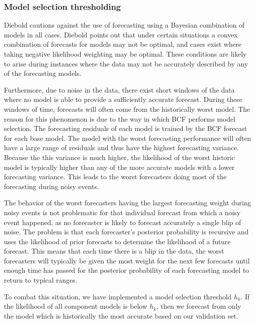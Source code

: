 \subsubsection{Model selection thresholding}
Diebold \cite{Diebold1991} cautions against the use of forecasting using a Bayesian combination of models in all cases.  Diebold points out that under certain situations a convex combination of forecasts for models may not be optimal, and cases exist where taking negative likelihood weighting may be optimal.  These conditions are likely to arise during instances where the data may not be accurately described by any of the forecasting models.  

Furthermore, due to noise in the data, there exist short windows of the data where no model is able to provide a sufficiently accurate forecast.  During these windows of time, forecasts will often come from the historically worst model.  The reason for this phenomenon is due to the way in which BCF performs model selection.  The forecasting residuals of each model is trained by the BCF forecast for each base model.  The model with the worst forecasting performance will often have a large range of residuals and thus have the highest forecasting variance.  Because the this variance is much higher, the likelihood of the worst historic model is typically higher than any of the more accurate models with a  lower forecasting variance.  This leads to the worst forecasters doing most of the forecasting during noisy events.  

The behavior of the worst forecasters having the largest forecasting weight during noisy events is not problematic for that individual forecast from which a noisy event happened, as no forecaster is likely to forecast accurately a single blip of noise.  The problem is that each forecaster's posterior probability is recursive and uses the likelihood of prior forecasts to determine the likelihood of a future forecast.  This means that each time there is a blip in the data, the worst forecasters will typically be given the most weight for the next few forecasts until enough time has passed for the posterior probability of each forecasting model to return to typical ranges.

To combat this situation, we have implemented a model selection threshold $h_{k}$.  If the likelihood of all component models is below $h_{k}$, then we forecast from only the model which is historically the most accurate based on our validation set.  

